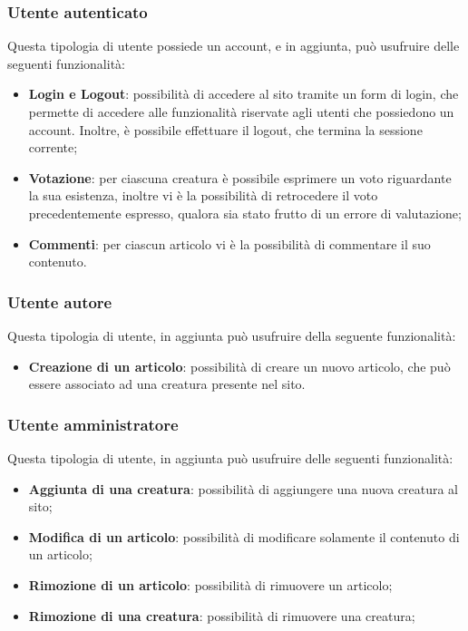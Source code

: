 \subsubsection{Utente autenticato}
Questa tipologia di utente possiede un account, e in aggiunta, può usufruire delle seguenti funzionalità:
\begin{itemize}
    \item \textbf{Login e Logout}: possibilità di accedere al sito tramite un form di login, che permette di accedere alle funzionalità riservate agli utenti che possiedono un account. Inoltre, è possibile effettuare il logout, che termina la sessione corrente;
    \item \textbf{Votazione}: per ciascuna creatura è possibile esprimere un voto riguardante la sua esistenza, inoltre vi è la possibilità di retrocedere il voto precedentemente espresso, qualora sia stato frutto di un errore di valutazione;
    \item \textbf{Commenti}: per ciascun articolo vi è la possibilità di commentare il suo contenuto.
\end{itemize}

\subsubsection{Utente autore}
Questa tipologia di utente, in aggiunta può usufruire della seguente funzionalità:
\begin{itemize}
    \item \textbf{Creazione di un articolo}: possibilità di creare un nuovo articolo, che può essere associato ad una creatura presente nel sito.
\end{itemize}

\subsubsection{Utente amministratore}
Questa tipologia di utente, in aggiunta può usufruire delle seguenti funzionalità:
\begin{itemize}
    \item \textbf{Aggiunta di una creatura}: possibilità di aggiungere una nuova creatura al sito;
    \item \textbf{Modifica di un articolo}: possibilità di modificare solamente il contenuto di un articolo;
    \item \textbf{Rimozione di un articolo}: possibilità di rimuovere un articolo;
    \item \textbf{Rimozione di una creatura}: possibilità di rimuovere una creatura;
\end{itemize}
